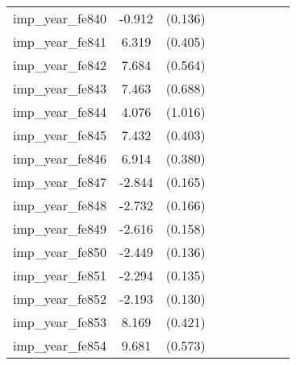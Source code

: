 {\begin{tabular}{l*{4}{cc}}
imp\_year\_fe840&   -0.912\sym{***}&  (0.136)&                  &         &                  &         &                  &         \\
imp\_year\_fe841&    6.319\sym{***}&  (0.405)&                  &         &                  &         &                  &         \\
imp\_year\_fe842&    7.684\sym{***}&  (0.564)&                  &         &                  &         &                  &         \\
imp\_year\_fe843&    7.463\sym{***}&  (0.688)&                  &         &                  &         &                  &         \\
imp\_year\_fe844&    4.076\sym{***}&  (1.016)&                  &         &                  &         &                  &         \\
imp\_year\_fe845&    7.432\sym{***}&  (0.403)&                  &         &                  &         &                  &         \\
imp\_year\_fe846&    6.914\sym{***}&  (0.380)&                  &         &                  &         &                  &         \\
imp\_year\_fe847&   -2.844\sym{***}&  (0.165)&                  &         &                  &         &                  &         \\
imp\_year\_fe848&   -2.732\sym{***}&  (0.166)&                  &         &                  &         &                  &         \\
imp\_year\_fe849&   -2.616\sym{***}&  (0.158)&                  &         &                  &         &                  &         \\
imp\_year\_fe850&   -2.449\sym{***}&  (0.136)&                  &         &                  &         &                  &         \\
imp\_year\_fe851&   -2.294\sym{***}&  (0.135)&                  &         &                  &         &                  &         \\
imp\_year\_fe852&   -2.193\sym{***}&  (0.130)&                  &         &                  &         &                  &         \\
imp\_year\_fe853&    8.169\sym{***}&  (0.421)&                  &         &                  &         &                  &         \\
imp\_year\_fe854&    9.681\sym{***}&  (0.573)&                  &         &                  &         &                  &         \\

\end{tabular}}
